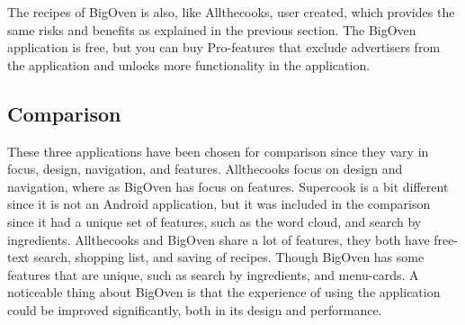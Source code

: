 The recipes of BigOven is also, like Allthecooks, user created, which provides the same risks and benefits as explained in the previous section.
The BigOven application is free, but you can buy Pro-features that exclude advertisers from the application and unlocks more functionality in the application.

\subsection{Comparison}
These three applications have been chosen for comparison since they vary in focus, design, navigation, and features. Allthecooks focus on design and navigation, where as BigOven has focus on features. Supercook is a bit different since it is not an Android application, but it was included in the comparison since it had a unique set of features, such as the word cloud, and search by ingredients.
Allthecooks and BigOven share a lot of features, they both have free-text search, shopping list, and saving of recipes. Though BigOven has some features that are unique, such as search by ingredients, and menu-cards. A noticeable thing about BigOven is that the experience of using the application could be improved significantly, both in its design and performance.


